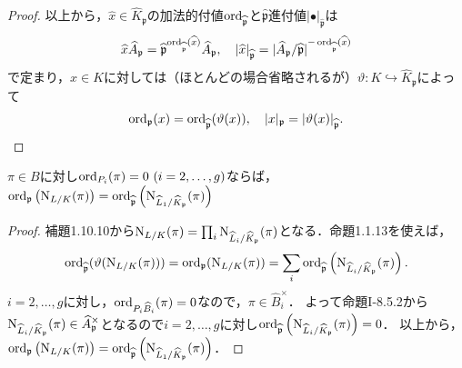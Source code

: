 \begin{proof}
  以上から，$\widehat{x}\in\widehat{K}_\mathfrak{p}$の加法的付値$\operatorname{ord}_{\widehat{\mathfrak{p}}}$と$\widehat{\mathfrak{p}}$進付値$\lvert\bullet\rvert_{\widehat{\mathfrak{p}}}$は
  \[\widehat{x}\widehat{A}_\mathfrak{p}=\widehat{\mathfrak{p}}^{\operatorname{ord}_{\widehat{\mathfrak{p}}}(\widehat{x})}\widehat{A}_\mathfrak{p},\quad\lvert\widehat{x}\rvert_{\widehat{\mathfrak{p}}}=\lvert\widehat{A}_\mathfrak{p}/\widehat{\mathfrak{p}}\rvert^{-\operatorname{ord}_{\widehat{\mathfrak{p}}}(\widehat{x})}\]
  で定まり，$x\in K$に対しては（ほとんどの場合省略されるが）$\vartheta\colon K\hookrightarrow\widehat{K}_\mathfrak{p}$によって
  \[\operatorname{ord}_\mathfrak{p}(x)=\operatorname{ord}_{\widehat{\mathfrak{p}}}(\vartheta(x)),\quad \lvert x\rvert_\mathfrak{p}=\lvert\vartheta(x)\rvert_{\widehat{\mathfrak{p}}}.\]
\end{proof}

\begin{screen}
    $\pi\in B$に対し$\ord_{P_i}(\pi)=0\ (i=2,\ldots,g)$ならば，$\operatorname{ord}_\mathfrak{p}\left(\operatorname{N}_{L/K}(\pi)\right)=\operatorname{ord}_{\widehat{\mathfrak{p}}}\left(\operatorname{N}_{\widehat{L}_1/\widehat{K}_\mathfrak{p}}(\pi)\right)$
\end{screen}
\begin{proof}
  補題1.10.10から$\operatorname{N}_{L/K}(\pi)=\prod_i\operatorname{N}_{\widehat{L}_i/\widehat{K}_\mathfrak{p}}(\pi)$となる．命題1.1.13を使えば，
  \[\operatorname{ord}_{\widehat{\mathfrak{p}}}(\vartheta(\operatorname{N}_{L/K}(\pi)))=\operatorname{ord}_\mathfrak{p}(\operatorname{N}_{L/K}(\pi))=\sum_i\operatorname{ord}_{\widehat{\mathfrak{p}}}\left(\operatorname{N}_{\widehat{L}_i/\widehat{K}_\mathfrak{p}}(\pi)\right).\]
  $i=2,\ldots,g$に対し，$\operatorname{ord}_{P_i\widehat{B}_i}(\pi)=0$なので，$\pi\in\widehat{B}_i^\times$．
  よって命題I-8.5.2から$\operatorname{N}_{\widehat{L}_i/\widehat{K}_\mathfrak{p}}(\pi)\in\widehat{A}_\mathfrak{p}^\times$となるので$i=2,\ldots,g$に対し$\operatorname{ord}_{\widehat{\mathfrak{p}}}\left(\operatorname{N}_{\widehat{L}_i/\widehat{K}_\mathfrak{p}}(\pi)\right)=0$．
  以上から，$\operatorname{ord}_\mathfrak{p}\left(\operatorname{N}_{L/K}(\pi)\right)=\operatorname{ord}_{\widehat{\mathfrak{p}}}\left(\operatorname{N}_{\widehat{L}_1/\widehat{K}_\mathfrak{p}}(\pi)\right)$．
\end{proof}

